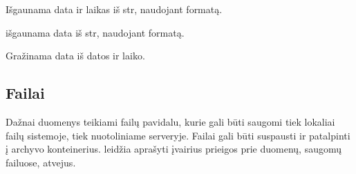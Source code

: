 \documentclass[letterpaper,10pt,lithuanian]{sphinxmanual}
\begin{document}

\begin{fulllineitems}
\label{\detokenize{formules:datetime}}
\pysigstartsignatures
\pysiglinewithargsret
{}
{\sphinxparamcomma {}}
{}
\pysigstopsignatures
\sphinxAtStartPar
Išgaunama data ir laikas iš str, naudojant  formatą.

\end{fulllineitems}


\begin{fulllineitems}
\label{\detokenize{formules:date}}
\pysigstartsignatures
\pysiglinewithargsret
{}
{\sphinxparamcomma {}}
{}
\pysigstopsignatures
\sphinxAtStartPar
išgaunama data iš str, naudojant  formatą.

\end{fulllineitems}


\begin{fulllineitems}
\label{\detokenize{formules:id0}}
\pysigstartsignatures
\pysiglinewithargsret
{}
{}
{}
\pysigstopsignatures
\sphinxAtStartPar
Gražinama data iš datos ir laiko.

\end{fulllineitems}



\subsection{Failai}
\label{\detokenize{formules:failai}}\label{\detokenize{formules:id3}}
\sphinxAtStartPar
Dažnai duomenys teikiami failų pavidalu, kurie gali būti saugomi tiek lokaliai
failų sistemoje, tiek nuotoliniame serveryje. Failai gali būti suspausti ir
patalpinti į archyvo konteinerius. {\hyperref[\detokenize{savokos:term-DSA}]{}} leidžia aprašyti įvairius
prieigos prie duomenų, saugomų failuose, atvejus.
\end{document}
